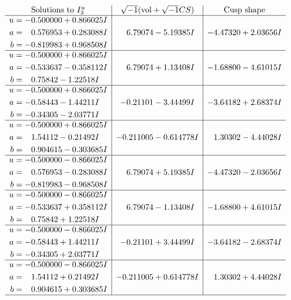 \documentclass[1p]{elsarticle_modified}
\theoremstyle{definition}
\newcommand{\I}{\sqrt{-1}}
\begin{document}
$$\begin{array}{c|c|c}  
\text{Solutions to }I^u_{3}& \I (\text{vol} + \sqrt{-1}CS) & \text{Cusp shape}\\
 \hline 
\begin{aligned}
u &= -0.500000 + 0.866025 I \\
a &= \phantom{-}0.576953 + 0.283088 I \\
b &= -0.819983 + 0.968508 I\end{aligned}
 & \phantom{-}6.79074 - 5.19385 I & -4.47320 + 2.03656 I \\ \hline\begin{aligned}
u &= -0.500000 + 0.866025 I \\
a &= -0.533637 - 0.358112 I \\
b &= \phantom{-}0.75842 - 1.22518 I\end{aligned}
 & \phantom{-}6.79074 + 1.13408 I & -1.68800 - 4.61015 I \\ \hline\begin{aligned}
u &= -0.500000 + 0.866025 I \\
a &= -0.58443 - 1.44211 I \\
b &= -0.34305 - 2.03771 I\end{aligned}
 & -0.21101 - 3.44499 I & -3.64182 + 2.68374 I \\ \hline\begin{aligned}
u &= -0.500000 + 0.866025 I \\
a &= \phantom{-}1.54112 - 0.21492 I \\
b &= \phantom{-}0.904615 - 0.303685 I\end{aligned}
 & -0.211005 - 0.614778 I & \phantom{-}1.30302 - 4.44028 I \\ \hline\begin{aligned}
u &= -0.500000 - 0.866025 I \\
a &= \phantom{-}0.576953 - 0.283088 I \\
b &= -0.819983 - 0.968508 I\end{aligned}
 & \phantom{-}6.79074 + 5.19385 I & -4.47320 - 2.03656 I \\ \hline\begin{aligned}
u &= -0.500000 - 0.866025 I \\
a &= -0.533637 + 0.358112 I \\
b &= \phantom{-}0.75842 + 1.22518 I\end{aligned}
 & \phantom{-}6.79074 - 1.13408 I & -1.68800 + 4.61015 I \\ \hline\begin{aligned}
u &= -0.500000 - 0.866025 I \\
a &= -0.58443 + 1.44211 I \\
b &= -0.34305 + 2.03771 I\end{aligned}
 & -0.21101 + 3.44499 I & -3.64182 - 2.68374 I \\ \hline\begin{aligned}
u &= -0.500000 - 0.866025 I \\
a &= \phantom{-}1.54112 + 0.21492 I \\
b &= \phantom{-}0.904615 + 0.303685 I\end{aligned}
 & -0.211005 + 0.614778 I & \phantom{-}1.30302 + 4.44028 I\\
 \hline 
 \end{array}$$\newpage
\end{document}

